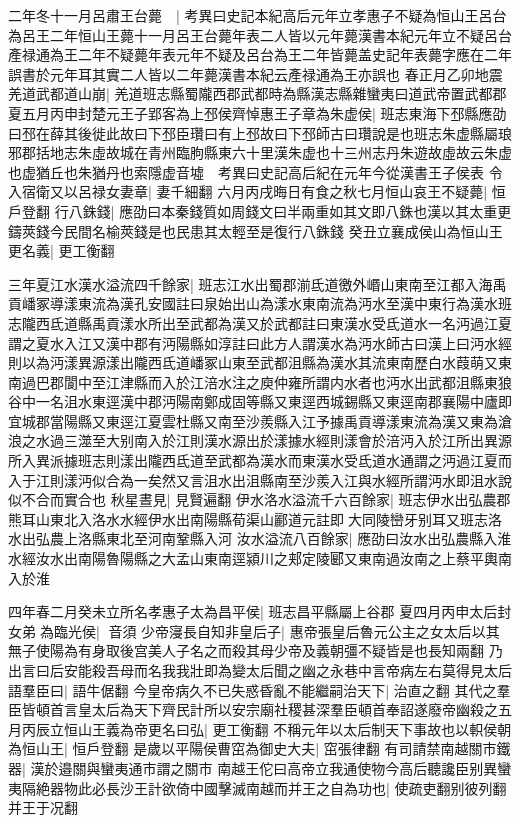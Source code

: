 二年冬十一月呂肅王台薨　|{
	考異曰史記本紀高后元年立孝惠子不疑為恒山王呂台為呂王二年恒山王薨十一月呂王台薨年表二人皆以元年薨漢書本紀元年立不疑呂台產禄通為王二年不疑薨年表元年不疑及呂台為王二年皆薨盖史記年表薨字應在二年誤書於元年耳其實二人皆以二年薨漢書本紀云產禄通為王亦誤也}
春正月乙卯地震羌道武都道山崩|{
	羌道班志縣蜀隴西郡武都時為縣漢志縣雜蠻夷曰道武帝置武都郡}
夏五月丙申封楚元王子郢客為上邳侯齊悼惠王子章為朱虚侯|{
	班志東海下邳縣應劭曰邳在薛其後徙此故曰下邳臣瓚曰有上邳故曰下邳師古曰瓚說是也班志朱虚縣屬琅邪郡括地志朱虛故城在青州臨朐縣東六十里漢朱虚也十三州志丹朱遊故虛故云朱虚也虚猶丘也朱猶丹也索隱虚音墟　考異曰史記高后紀在元年今從漢書王子侯表}
令入宿衛又以呂禄女妻章|{
	妻千細翻}
六月丙戌晦日有食之秋七月恒山哀王不疑薨|{
	恒戶登翻}
行八銖錢|{
	應劭曰本秦錢質如周錢文曰半兩重如其文即八銖也漢以其太重更鑄莢錢今民間名榆莢錢是也民患其太輕至是復行八銖錢}
癸丑立襄成侯山為恒山王更名義|{
	更工衡翻}


三年夏江水漢水溢流四千餘家|{
	班志江水出蜀郡湔氐道徼外㟭山東南至江都入海禹貢嶓冢導漾東流為漢孔安國註曰泉始出山為漾水東南流為沔水至漢中東行為漢水班志隴西氐道縣禹貢漾水所出至武都為漢又於武都註曰東漢水受氐道水一名沔過江夏謂之夏水入江又漢中郡有沔陽縣如淳註曰此方人謂漢水為沔水師古曰漢上曰沔水經則以為沔漾異源漾出隴西氐道嶓冢山東至武都沮縣為漢水其流東南歷白水葭萌又東南過巴郡閬中至江津縣而入於江涪水注之庾仲雍所謂内水者也沔水出武都沮縣東狼谷中一名沮水東逕漢中郡沔陽南鄭成固等縣又東逕西城錫縣又東逕南郡襄陽中廬即宜城郡當陽縣又東逕江夏雲杜縣又南至沙羨縣入江予據禹貢導漾東流為漢又東為滄浪之水過三澨至大别南入於江則漢水源出於漾據水經則漾會於涪沔入於江所出異源所入異派據班志則漾出隴西氐道至武都為漢水而東漢水受氐道水通謂之沔過江夏而入于江則漾沔似合為一矣然又言沮水出沮縣南至沙羨入江與水經所謂沔水即沮水說似不合而實合也}
秋星晝見|{
	見賢遍翻}
伊水洛水溢流千六百餘家|{
	班志伊水出弘農郡熊耳山東北入洛水水經伊水出南陽縣荀渠山酈道元註即大同陵巒牙别耳又班志洛水出弘農上洛縣東北至河南鞏縣入河}
汝水溢流八百餘家|{
	應劭曰汝水出弘農縣入淮水經汝水出南陽魯陽縣之大孟山東南逕潁川之郏定陵郾又東南過汝南之上蔡平輿南入於淮}


四年春二月癸未立所名孝惠子太為昌平侯|{
	班志昌平縣屬上谷郡}
夏四月丙申太后封女弟為臨光侯|{
	音須}
少帝寖長自知非皇后子|{
	惠帝張皇后魯元公主之女太后以其無子使陽為有身取後宫美人子名之而殺其母少帝及義朝彊不疑皆是也長知兩翻}
乃出言曰后安能殺吾母而名我我壯即為變太后聞之幽之永巷中言帝病左右莫得見太后語羣臣曰|{
	語牛倨翻}
今皇帝病久不已失惑昏亂不能繼嗣治天下|{
	治直之翻}
其代之羣臣皆頓首言皇太后為天下齊民計所以安宗廟社稷甚深羣臣頓首奉詔遂廢帝幽殺之五月丙辰立恒山王義為帝更名曰弘|{
	更工衡翻}
不稱元年以太后制天下事故也以軹侯朝為恒山王|{
	恒戶登翻}
是歲以平陽侯曹窋為御史大夫|{
	窋張律翻}
有司請禁南越關市鐵器|{
	漢於邉關與蠻夷通市謂之關市}
南越王佗曰高帝立我通使物今高后聽讒臣别異蠻夷隔絶器物此必長沙王計欲倚中國擊滅南越而并王之自為功也|{
	使疏吏翻别彼列翻并王于况翻}


